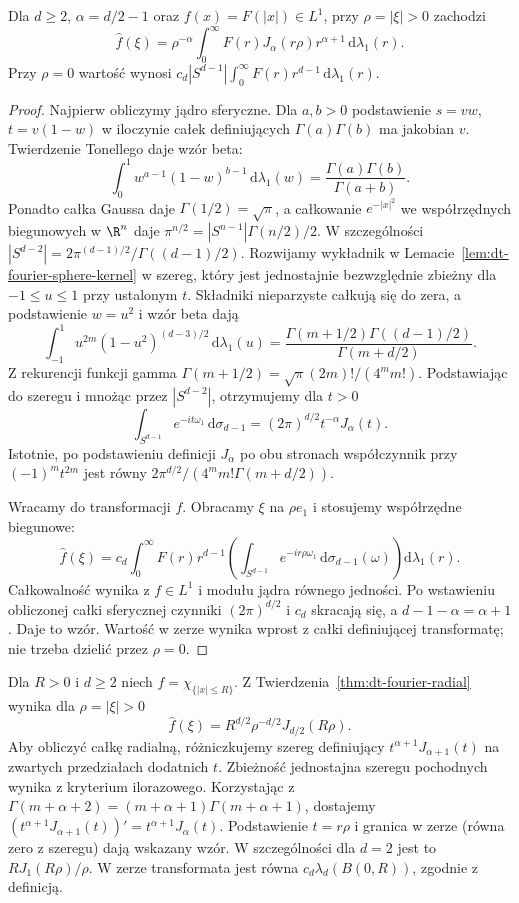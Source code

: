 \begin{twierdzenie}
\label{thm:dt-fourier-radial}
Dla $d\ge2$, $\alpha=d/2-1$ oraz $f(x)=F(|x|)\in L^1$,
przy $\rho=|\xi|>0$ zachodzi
\[
 \widehat f(\xi)=\rho^{-\alpha}\int_0^\infty
 F(r)J_\alpha(r\rho)r^{\alpha+1}\,\mathrm d\lambda_1(r).
\]
Przy $\rho=0$ wartość wynosi
$c_d|S^{d-1}|\int_0^\infty F(r)r^{d-1}\,\mathrm d\lambda_1(r)$.
\end{twierdzenie}
\begin{proof}
Najpierw obliczymy jądro sferyczne. Dla $a,b>0$
podstawienie $s=vw$, $t=v(1-w)$ w iloczynie całek
definiujących $\Gamma(a)\Gamma(b)$ ma jakobian $v$.
Twierdzenie Tonellego daje wzór beta:
\[
 \int_0^1 w^{a-1}(1-w)^{b-1}\,\mathrm d\lambda_1(w)
 =\frac{\Gamma(a)\Gamma(b)}{\Gamma(a+b)}.
\]
Ponadto całka Gaussa daje $\Gamma(1/2)=\sqrt{\pi}$,
a całkowanie $e^{-|x|^2}$ we współrzędnych biegunowych
w $\R^n$ daje
$\pi^{n/2}=|S^{n-1}|\Gamma(n/2)/2$.
W szczególności $|S^{d-2}|=2\pi^{(d-1)/2}/\Gamma((d-1)/2)$.
Rozwijamy wykładnik w Lemacie~\ref{lem:dt-fourier-sphere-kernel}
w szereg, który jest jednostajnie bezwzględnie zbieżny
dla $-1\le u\le1$ przy ustalonym $t$.
Składniki nieparzyste całkują się do zera, a podstawienie
$w=u^2$ i wzór beta dają
\[
 \int_{-1}^1 u^{2m}(1-u^2)^{(d-3)/2}\,\mathrm d\lambda_1(u)
 =\frac{\Gamma(m+1/2)\Gamma((d-1)/2)}{\Gamma(m+d/2)}.
\]
Z rekurencji funkcji gamma
$\Gamma(m+1/2)=\sqrt{\pi}(2m)!/(4^m m!)$.
Podstawiając do szeregu i mnożąc przez $|S^{d-2}|$,
otrzymujemy dla $t>0$
\[
 \int_{S^{d-1}}e^{-it\omega_1}\,\mathrm d\sigma_{d-1}
 =(2\pi)^{d/2}t^{-\alpha}J_\alpha(t).
\]
Istotnie, po podstawieniu definicji $J_\alpha$ po obu
stronach współczynnik przy $(-1)^mt^{2m}$ jest równy
$2\pi^{d/2}/(4^m m!\Gamma(m+d/2))$.

Wracamy do transformacji $f$. Obracamy $\xi$ na
$\rho e_1$ i stosujemy współrzędne biegunowe:
\[
 \widehat f(\xi)=c_d\int_0^\infty F(r)r^{d-1}
 \left(\int_{S^{d-1}}e^{-ir\rho\omega_1}
 \,\mathrm d\sigma_{d-1}(\omega)\right)\mathrm d\lambda_1(r).
\]
Całkowalność wynika z $f\in L^1$ i modułu jądra równego
jedności. Po wstawieniu obliczonej całki sferycznej
czynniki $(2\pi)^{d/2}$ i $c_d$ skracają się, a
$d-1-\alpha=\alpha+1$. Daje to wzór.
Wartość w zerze wynika wprost z całki definiującej
transformatę; nie trzeba dzielić przez $\rho=0$.
\end{proof}

\begin{przyklad}
\label{ex:dt-fourier-ball}
Dla $R>0$ i $d\ge2$ niech $f=\chi_{\{|x|\le R\}}$.
Z Twierdzenia~\ref{thm:dt-fourier-radial} wynika dla
$\rho=|\xi|>0$
\[
 \widehat f(\xi)=R^{d/2}\rho^{-d/2}J_{d/2}(R\rho).
\]
Aby obliczyć całkę radialną, różniczkujemy szereg
definiujący $t^{\alpha+1}J_{\alpha+1}(t)$ na zwartych
przedziałach dodatnich $t$. Zbieżność jednostajna
szeregu pochodnych wynika z kryterium ilorazowego.
Korzystając z $\Gamma(m+\alpha+2)=(m+\alpha+1)\Gamma(m+\alpha+1)$,
dostajemy
$(t^{\alpha+1}J_{\alpha+1}(t))'=t^{\alpha+1}J_\alpha(t)$.
Podstawienie $t=r\rho$ i granica w zerze (równa zero
z szeregu) dają wskazany wzór. W szczególności dla $d=2$
jest to $R J_1(R\rho)/\rho$. W zerze transformata jest
równa $c_d\lambda_d(B(0,R))$, zgodnie z definicją.
\end{przyklad}
